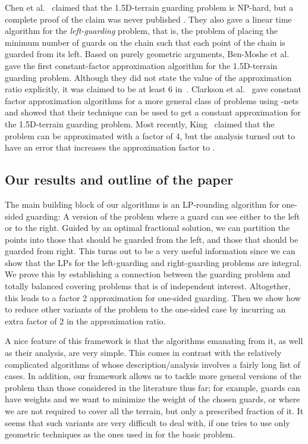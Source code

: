 \documentclass[11pt]{article}
\begin{document}
Chen et al.~\cite{conf/cccg/ChenEU95} claimed that the 1.5D-terrain guarding
problem is NP-hard, but a complete proof of the claim was never published
\cite{conf/cccg/DemaineO06,conf/latin/King06,journals/siamcomp/Ben-MosheKM07}. They
also gave a linear time algorithm for the \emph{left-guarding} problem, that
is, the problem of placing the minimum number of guards on the chain such that
each point of the chain is guarded from its left.  Based on purely geometric
arguments, Ben-Moshe et al.~\cite{journals/siamcomp/Ben-MosheKM07} gave the
first constant-factor approximation algorithm for the 1.5D-terrain guarding
problem. Although they did not state the value of the approximation ratio
explicitly, it was claimed to be at least 6
in~\cite{conf/latin/King06}. Clarkson et al.~\cite{conf/compgeom/ClarksonV05}
gave constant factor approximation algorithms for a more general class of
problems using -nets and showed that their technique can be used to
get a constant approximation for the 1.5D-terrain guarding problem. Most
recently, King~\cite{conf/latin/King06} claimed that the problem can be
approximated with a factor of 4, but the analysis turned out to have an error
that increases the approximation factor to  \cite{misc/errata/King}.

\subsection{Our results and outline of the paper}
\label{sec:our-results}

The main building block of our algorithms is an LP-rounding algorithm for
one-sided guarding: A version of the problem where a guard can see either to
the left or to the right. Guided by an optimal fractional solution, we can
partition the points into those that should be guarded from the left, and
those that should be guarded from right. This turns out to be a very useful
information since we can show that the LPs for the left-guarding and
right-guarding problems are integral. We prove this by establishing a
connection between the guarding problem and totally balanced covering problems
that is of independent interest. Altogether, this leads to a factor 2
approximation for one-sided guarding. Then we show how to reduce other
variants of the problem to the one-sided case by incurring an extra factor of
2 in the approximation ratio.

A nice feature of this framework is that the algorithms emanating from it, as
well as their analysis, are very simple. This comes in contrast with the
relatively complicated algorithms of
\cite{journals/siamcomp/Ben-MosheKM07,conf/latin/King06} whose
description/analysis involves a fairly long list of cases.  In addition, our
framework allows us to tackle more general versions of the problem than those
considered in the literature thus far; for example, guards can have weights
and we want to minimize the weight of the chosen guards, or where we are not
required to cover all the terrain, but only a prescribed fraction of it. It
seems that such variants are very difficult to deal with, if one tries to use
only geometric techniques as the ones used in
\cite{journals/siamcomp/Ben-MosheKM07,conf/latin/King06} for the basic
problem.
\end{document}
